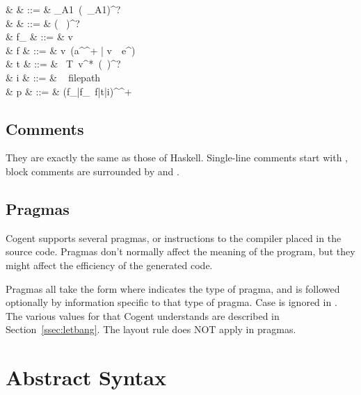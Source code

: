 \documentclass[a4paper]{article}
\newcommand{\cogent}{Cogent\xspace}
\begin{document}
{\begin{grammar}
                    & \tau         & ::= & \tau_{A1}\ (\code{->}\ \tau_{A1})^? \\
                    & \sigma       & ::= & (\  )^?\ \tau\\
           & f_{\sigma}   & ::= & v\ \code{:}\ \sigma \\
          & f            & ::= & v\ ({a^{}}^+ | v\ \code{=}\ e^{})  \\
              & t            & ::= & \ T\ v^*\ (\code{=}\ \tau)^? \\
                      & i            & ::= & \  filepath  \\
                      & p            & ::= & {(f_{\sigma}|f_{\sigma}\ f|t|i)^{}}^+
\end{grammar}
}

\subsection{Comments}
They are exactly the same as those of Haskell. Single-line comments start with \code{-}\code{-}, block comments are surrounded by \code{\{-} and \code{-\}}.

\subsection{Pragmas}

\cogent supports several pragmas, or instructions to the compiler placed in the source code. Pragmas don't normally affect the meaning of the program, but they might affect the efficiency of the generated code.

Pragmas all take the form  where  indicates the type of pragma, and is followed optionally by information specific to that type of pragma. Case is ignored in . The various values for  that \cogent understands are described in Section~\ref{ssec:letbang}. The layout rule does NOT apply in pragmas.


\section{Abstract Syntax}
\end{document}

